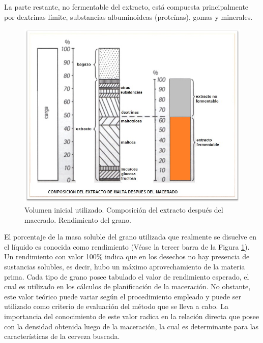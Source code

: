             \par La parte restante, no fermentable del extracto, está compuesta principalmente por dextrinas límite, substancias albuminoideas (proteínas), gomas y minerales.
            \begin{figure} [H]		                                                                        \centerline{\includegraphics[scale=0.6]{composicion_luego_macerado.jpg}}
                \caption{Volumen inicial utilizado. Composición del extracto después del macerado. Rendimiento del grano.}
                \label{ComposicionExtracto}
            \end{figure}
            
            \par El porcentaje de la masa soluble del grano utilizada que realmente se disuelve en el líquido es conocida como rendimiento (Véase la tercer barra de la Figura \ref{ComposicionExtracto}). Un rendimiento con valor 100\% indica que en los desechos no hay presencia de sustancias solubles, es decir, hubo un máximo aprovechamiento de la materia prima. Cada tipo de grano posee tabulado el valor de rendimiento esperado, el cual es utilizado en los cálculos de planificación de la maceración. No obstante, este valor teórico puede variar según el procedimiento empleado y puede ser utilizado como criterio de evaluación del método que se lleva a cabo. La importancia del conocimiento de este valor radica en la relación directa que posee con la densidad obtenida luego de la maceración, la cual es determinante para las características de la cerveza buscada. 
            
